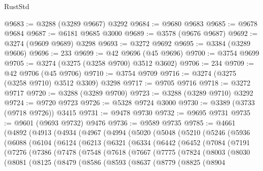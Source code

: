 \begin{lexlean}{RustStd}
\begin{coremodule}
@9683 := @3288 (@3289 @9667) @3292
@9684 := @9680 @9683
@9685 := @9678 @9684
@9687 := @6181 @9685 @3000
@9689 := @3578 (@9676 @9687)
@9692 := @3274 (@9609 @9689) @3298
@9693 := @3272 @9692
@9695 := @3384 (@3289 @9606)
@9696 := 233
@9699 := @42 @9696 (@45 @9696)
@9700 := @3754 @9699
@9705 := @3274 (@3275 (@3258 @9700) @3512 @3602)
@9706 := 234
@9709 := @42 @9706 (@45 @9706)
@9710 := @3754 @9709
@9716 := @3274 (@3275 (@3258 @9710) @3512 @3309) @3298
@9717 := @9705 @9716
@9718 := @3272 @9717
@9720 := @3288 (@3289 @9700)
@9723 := @3288 (@3289 @9710) @3292
@9724 := @9720 @9723
@9726 := @5328 @9724 @3000
@9730 := @3389 (@3733 (@9718 @9726)) @3415
@9731 := @9478 @9730
@9732 := @9695 @9731
@9735 := @9601 (@9693 @9732) @9476
@9736 := @9589 @9735
@9785 := @4661
    (@4892
      (@4913
        (@4934
          (@4967
            (@4994
              (@5020
                (@5048
                  (@5210
                    (@5246
                      (@5936
                        (@6088
                          (@6104
                            (@6124
                              (@6213
                                (@6321
                                  (@6334
                                    (@6442
                                      (@6452
                                        (@7084
                                          (@7191
                                            (@7276
                                              (@7386
                                                (@7478
                                                  (@7548
                                                    (@7618
                                                      (@7667
                                                        (@7775
                                                          (@7824
                                                            (@8003
                                                              (@8030
                                                                (@8081
                                                                  (@8125
                                                                    (@8479
                                                                      (@8586
                                                                        (@8593
                                                                          (@8637
                                                                            (@8779
                                                                              (@8825
                                                                                (@8904

\end{coremodule}
\end{lexlean}
